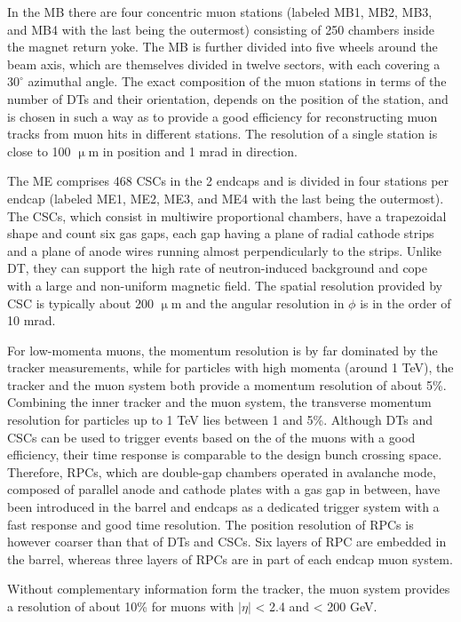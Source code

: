In the MB there are four concentric muon stations (labeled MB1, MB2, MB3, and MB4 with the last being the outermost) consisting of 250 chambers inside the magnet return yoke. The MB is further divided into five wheels around the beam axis, which are themselves divided in twelve sectors, with each covering a $30^{\circ}$ azimuthal angle. The exact composition of the muon stations in terms of the number of DTs and their orientation, depends on the position of the station, and is chosen in such a way as to provide a good efficiency for reconstructing muon tracks from muon hits in different stations. The resolution of a single station is close to 100 $\upmu$m in position and 1 mrad in direction.

The ME comprises 468 CSCs in the 2 endcaps and is divided in four stations per endcap (labeled ME1, ME2, ME3, and ME4 with the last being the outermost). The CSCs, which consist in multiwire proportional chambers, have a trapezoidal shape and count six gas gaps, each gap having a plane of radial cathode strips and a plane of anode wires running almost perpendicularly to the strips. Unlike DT, they can support the high rate of neutron-induced background and cope with a large and non-uniform magnetic field. The spatial resolution provided by CSC is typically about 200 $\upmu$m and the angular resolution in $\phi$ is in the order of 10 mrad.

For low-momenta muons, the momentum resolution is by far dominated by the tracker measurements, while for particles with high momenta (around 1 TeV), the tracker and the muon system both provide a momentum resolution of about 5\%. Combining the inner tracker and the muon system, the transverse momentum resolution for particles up to 1 TeV lies between 1 and 5\%. Although DTs and CSCs can be used to trigger events based on the \pt of the muons with a good efficiency, their time response is comparable to the design bunch crossing space. Therefore, RPCs, which are double-gap chambers operated in avalanche mode, composed of parallel anode and cathode plates with a gas gap in between, have been introduced in the barrel and endcaps as a dedicated trigger system with a fast response and good time resolution. The position resolution of RPCs is however coarser than that of DTs and CSCs. Six layers of RPC are embedded in the barrel, whereas three layers of RPCs are in part of each endcap muon system.

Without complementary information form the tracker, the muon system provides a resolution of about 10\% for muons with $|\eta|$ < 2.4 and \pt < 200 GeV.

